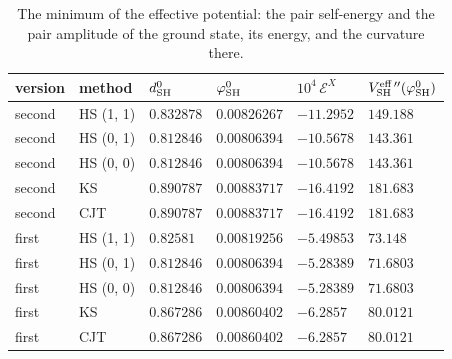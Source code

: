 \documentclass[aps,prd,onecolumn,superscriptaddress,nofootinbib,floatfix,longbibliography]{revtex4-2}
\begin{document}
\begin{table}[!htbp]
\caption{\label{tab:minimum}The minimum of the effective potential: the pair self-energy and the pair amplitude of the ground state, its energy, and the curvature there.}
\begingroup\centering\footnotesize\setlength{\tabcolsep}{4pt}
\begin{tabular}{llllll}
\hline\hline
version & method & $d^0_{\rm SH}$ & $\varphi^0_{\rm SH}$ & $10^4\,\mathcal E^X$ & $V^{\rm eff\,\prime\prime}_{\rm SH}(\varphi^0_{\rm SH})$ \\ \hline
second & HS (1, 1) & $0.832878$ & $0.00826267$ & $-11.2952$ & $149.188$ \\
second & HS (0, 1) & $0.812846$ & $0.00806394$ & $-10.5678$ & $143.361$ \\
second & HS (0, 0) & $0.812846$ & $0.00806394$ & $-10.5678$ & $143.361$ \\
second & KS & $0.890787$ & $0.00883717$ & $-16.4192$ & $181.683$ \\
second & CJT & $0.890787$ & $0.00883717$ & $-16.4192$ & $181.683$ \\
first & HS (1, 1) & $0.82581$ & $0.00819256$ & $-5.49853$ & $73.148$ \\
first & HS (0, 1) & $0.812846$ & $0.00806394$ & $-5.28389$ & $71.6803$ \\
first & HS (0, 0) & $0.812846$ & $0.00806394$ & $-5.28389$ & $71.6803$ \\
first & KS & $0.867286$ & $0.00860402$ & $-6.2857$ & $80.0121$ \\
first & CJT & $0.867286$ & $0.00860402$ & $-6.2857$ & $80.0121$ \\
\hline\hline
\end{tabular}\par
\endgroup
\end{table}
\end{document}
